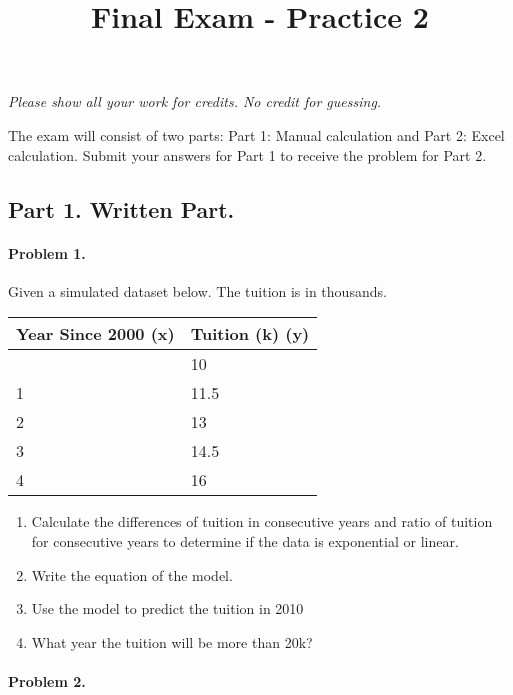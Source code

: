 \documentclass[
  letterpaper,
  DIV=11,
  numbers=noendperiod]{scrartcl}
\title{Final Exam - Practice 2}
\author{}
\date{}
\let\oldparagraph\paragraph
\renewcommand{\paragraph}[1]{\oldparagraph{#1}\mbox{}}
\begin{document}
\maketitle


\emph{Please show all your work for credits. No credit for guessing. }

The exam will consist of two parts: Part 1: Manual calculation and Part
2: Excel calculation. Submit your answers for Part 1 to receive the
problem for Part 2.

\subsection{Part 1. Written Part.}\label{part-1.-written-part.}

\paragraph{Problem 1.}\label{problem-1.}

Given a simulated dataset below. The tuition is in thousands.

\begin{longtable}[]{@{}ll@{}}
\toprule\noalign{}
Year Since 2000 (x) & Tuition (k) (y) \\
\midrule\noalign{}
\endhead
\bottomrule\noalign{}
\endlastfoot
0 & 10 \\
1 & 11.5 \\
2 & 13 \\
3 & 14.5 \\
4 & 16 \\
\end{longtable}

\begin{enumerate}
\def\labelenumi{\arabic{enumi}.}
\item
  Calculate the differences of tuition in consecutive years and ratio of
  tuition for consecutive years to determine if the data is exponential
  or linear.
\item
  Write the equation of the model.
\item
  Use the model to predict the tuition in 2010
\item
  What year the tuition will be more than 20k?
\end{enumerate}

\pagebreak

\paragraph{Problem 2.}\label{problem-2.}
\end{document}
